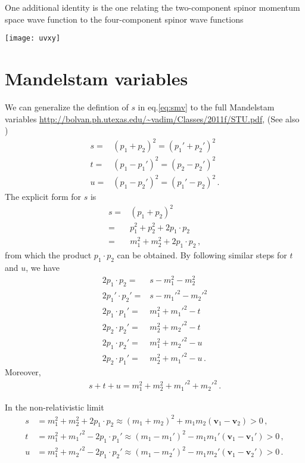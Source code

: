One additional identity is the one relating the two-component spinor momentum space wave function to the four-component spinor wave functions

\texttt{[image: uvxy]}

\section{Mandelstam variables}

We can generalize the defintion of $s$ in eq.\eqref{eq:smv} to the full
Mandelstam variables \url{http://bolvan.ph.utexas.edu/~vadim/Classes/2011f/STU.pdf}, (See also \cite{Peskin})
\begin{align}
\label{eq:mvstu}
  s=&\left( p_1+p_2 \right)^2=\left( p_1'+p_2' \right)^2 \nonumber\\
  t=&\left( p_1-p_1' \right)^2=\left( p_2-p_2' \right)^2 \nonumber\\
  u=&\left( p_1-p_2' \right)^2=\left( p_1'-p_2 \right)^2 \,.
\end{align}
The explicit form for $s$ is
\begin{align}
  s=&\left( p_1+p_2 \right)^2 \nonumber\\
 =& p_1^2+p_2^2+2 p_1\cdot p_2 \nonumber\\
=& m_1^2+m_2^2+2 p_1\cdot p_2\,,
\end{align}
from which the product $p_1\cdot p_2$ can be obtained.  By following similar steps for $t$ and $u$, we have
\begin{align}
\label{eq:stucs}
  2 p_1\cdot p_2=&s- m_1^2-m_2^2 \nonumber\\
  2 p_1'\cdot p_2'=&s- {m_1'}^2-{m_2'}^2 \nonumber\\
  2 p_1\cdot p_1'=&m_1^2+{m_1'}^2 -t \nonumber\\
  2 p_2\cdot p_2'=&m_2^2+{m_2'}^2 -t \nonumber\\
  2 p_1\cdot p_2'=&m_1^2+{m_2'}^2 -u \nonumber\\
  2 p_2\cdot p_1'=&m_2^2+{m_1'}^2 -u \,.
\end{align}
Moreover,
\begin{align}
  s+t+u=m_1^2+m_2^2+{m_1'}^2+{m_2'}^2\,.
\end{align}

In the non-relativistic limit
\begin{align}
  s&=m_1^2+m_2^2   +2 p_1\cdot p_2 \approx (m_1+m_2)^2  + m_1m_2 (\mathbf{v}_1-\mathbf{v}_2)>0\,, \nonumber\\
  t&=m_1^2+{m_1'}^2-2 p_1\cdot p_1'\approx (m_1-m_1')^2 - m_1m_1' (\mathbf{v}_1-\mathbf{v}_1')>0\,,\nonumber\\
  u&=m_1^2+{m_2'}^2-2 p_1\cdot p_2'\approx (m_1-m_2')^2 - m_1m_2'  (\mathbf{v}_1-\mathbf{v}_2')>0\,.
\end{align}


